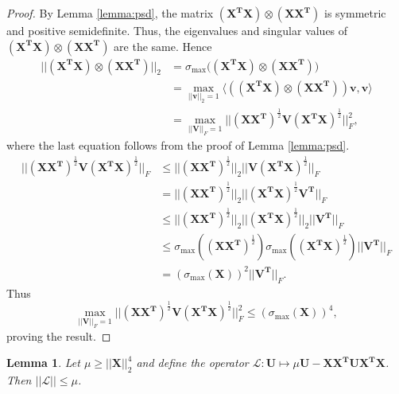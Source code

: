 \documentclass[12pt]{article}
\newtheorem{lemma}[theorem]{Lemma}
\begin{document}
\begin{proof}
By Lemma \ref{lemma:psd}, the matrix $\mathbf{(X^TX) \otimes (XX^T)}$ is symmetric and positive semidefinite.  Thus, the eigenvalues and singular values of $\mathbf{(X^TX) \otimes (XX^T)}$ are the same. Hence
\begin{equation*}
    \begin{split}
        ||\mathbf{(X^TX) \otimes (XX^T)}||_2 & = \sigma_{\text{max}}(\mathbf{(X^TX) \otimes (XX^T))} \\
        & = \max_{||\mathbf{v}||_2=1} \langle \mathbf{((X^TX) \otimes (XX^T))v, v}\rangle \\
        & = \max_{||\mathbf{V}||_F=1} ||\mathbf{(XX^T)}^{\frac{1}{2}}\mathbf{V(X^TX)}^{\frac{1}{2}}||_F^2,
    \end{split}
\end{equation*}
where the last equation follows from the proof of Lemma \ref{lemma:psd}.
\begin{equation*}
    \begin{split}
        ||\mathbf{(XX^T)}^{\frac{1}{2}}\mathbf{V(X^TX)}^{\frac{1}{2}}||_F & \leq ||\mathbf{(XX^T)}^{\frac{1}{2}}||_2 ||\mathbf{V(X^TX)}^{\frac{1}{2}}||_F \\
        & = ||\mathbf{(XX^T)}^{\frac{1}{2}}||_2 ||\mathbf{(X^TX)}^{\frac{1}{2}}\mathbf{V^T}||_F \\
        & \leq ||\mathbf{(XX^T)}^{\frac{1}{2}}||_2 ||\mathbf{(X^TX)}^{\frac{1}{2}}||_2 ||\mathbf{V^T}||_F \\
        & \leq \sigma_{\text{max}}(\mathbf{(XX^T)}^{\frac{1}{2}}) \sigma_{\text{max}}(\mathbf{(X^TX)}^{\frac{1}{2}}) ||\mathbf{V^T}||_F \\
        & = (\sigma_{\text{max}}(\mathbf{X}))^2 ||\mathbf{V^T}||_F. 
    \end{split}
\end{equation*}
Thus 
\[
\max_{||\mathbf{V}||_F=1} ||\mathbf{(XX^T)}^{\frac{1}{2}}\mathbf{V(X^TX)}^{\frac{1}{2}}||_F^2 \leq (\sigma_{\text{max}}\mathbf{(X)})^4,
\]
proving the result.
\end{proof}

\begin{lemma}
\label{lem:L_opnorm}
    Let  $\mu \geq ||\mathbf{X}||_2^4$ and define  the operator $\mathscr{L}: \mathbf{U} \mapsto \mu \mathbf{U} - \mathbf{XX^T U X^TX}$.  Then $ || \mathscr{L} || \leq \mu$.  
\end{lemma}
\end{document}
